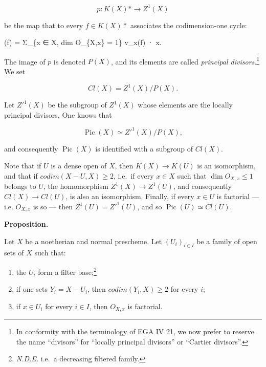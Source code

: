 \documentclass[
  11pt,
  a4paper,
]{book}
\newenvironment{Shaded}{}{}
\newcommand{\NormalTok}[1]{#1}
\providecommand{\tightlist}{%
  \setlength{\itemsep}{0pt}\setlength{\parskip}{0pt}}
\begin{document}
\[ p: K(X)* \longrightarrow Z^{1}(X) \]

be the map that to every \(f \in K(X)*\) associates the codimension-one
cycle:

\begin{Shaded}
\begin{Highlighting}[]
\NormalTok{(f) = Σ\_\{x ∈ X, dim O\_\{X,x\} = 1\} v\_x(f) · x.}
\end{Highlighting}
\end{Shaded}

The image of \(p\) is denoted \(P(X)\), and its elements are called
\emph{principal divisors}.\footnote{In conformity with the terminology
  of EGA IV 21, we now prefer to reserve the name ``divisors'' for
  ``locally principal divisors'' or ``Cartier divisors''.} We set

\[ Cl(X) = Z^{1}(X)/P(X). \]

Let \(Z'^{1}(X)\) be the subgroup of \(Z^{1}(X)\) whose elements are the
locally principal divisors. One knows that

\[ \operatorname{Pic}(X) \simeq Z'^{1}(X)/P(X), \]

and consequently \(\operatorname{Pic}(X)\) is identified with a subgroup
of \(Cl(X)\).

Note that if \(U\) is a dense open of \(X\), then \(K(X) \to K(U)\) is
an isomorphism, and that if \(codim(X - U, X) \geqslant
2\), i.e.~if every \(x \in X\) such that \(\dim O_{X,x} \leqslant 1\)
belongs to \(U\), the homomorphism \(Z^{1}(X) \to
Z^{1}(U)\), and consequently \(Cl(X) \to Cl(U)\), is also an
isomorphism. Finally, if every \(x \in U\) is factorial --- i.e.
\(O_{X,x}\) is so --- then \(Z^{1}(U) = Z'^{1}(U)\), and so
\(\operatorname{Pic}(U) \simeq Cl(U)\).

\textbf{Proposition.}

Let \(X\) be a noetherian and normal prescheme. Let
\((U_{i})_{i \in I}\) be a family of open sets of \(X\) such that:

\begin{enumerate}
\def\labelenumi{\arabic{enumi}.}
\tightlist
\item
  the \(U_{i}\) form a filter base;\footnote{\emph{N.D.E.} i.e.~a
    decreasing filtered family.}
\item
  if one sets \(Y_{i} = X - U_{i}\), then
  \(codim(Y_{i}, X) \geqslant 2\) for every \(i\);
\item
  if \(x \in U_{i}\) for every \(i \in I\), then \(O_{X,x}\) is
  factorial.
\end{enumerate}
\end{document}
